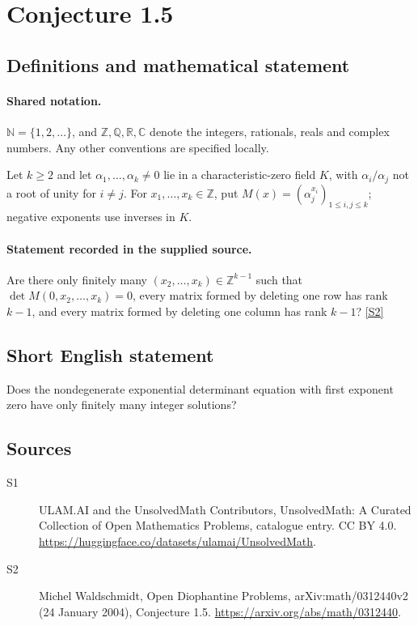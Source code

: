 \documentclass[11pt]{article}
\newcommand{\sref}[2]{\hyperlink{source:#1:#2}{[S#2]}}
\begin{document}
\section{Conjecture 1.5}\label{statement}

\subsection{Definitions and mathematical statement}

\paragraph{Shared notation.}$\mathbb N=\{1,2,\ldots\}$, and $\mathbb Z,\mathbb Q,\mathbb R,\mathbb C$ denote the integers, rationals, reals and complex numbers. Any other conventions are specified locally.


Let $k\ge2$ and let $\alpha_1,\ldots,\alpha_k\ne0$ lie in a characteristic-zero field $K$, with $\alpha_i/\alpha_j$ not a root of unity for $i\ne j$. For $x_1,\ldots,x_k\in\mathbb Z$, put $M(x)=(\alpha_j^{x_i})_{1\le i,j\le k}$; negative exponents use inverses in $K$.
\paragraph{Statement recorded in the supplied source.}
Are there only finitely many $(x_2,\ldots,x_k)\in\mathbb Z^{k-1}$ such that $\det M(0,x_2,\ldots,x_k)=0$, every matrix formed by deleting one row has rank $k-1$, and every matrix formed by deleting one column has rank $k-1$? \sref{statement}{2}
\subsection{Short English statement}
Does the nondegenerate exponential determinant equation with first exponent zero have only finitely many integer solutions?
\subsection{Sources}
\begin{description}
\item[\hypertarget{source:statement:1}{S1}] ULAM.AI and the UnsolvedMath Contributors, UnsolvedMath: A Curated Collection of Open Mathematics Problems, catalogue entry. CC BY 4.0. \url{https://huggingface.co/datasets/ulamai/UnsolvedMath}.
\item[\hypertarget{source:statement:2}{S2}] Michel Waldschmidt, Open Diophantine Problems, arXiv:math/0312440v2 (24 January 2004), Conjecture 1.5. \url{https://arxiv.org/abs/math/0312440}.
\end{description}
\label{end:statement}
\end{document}
